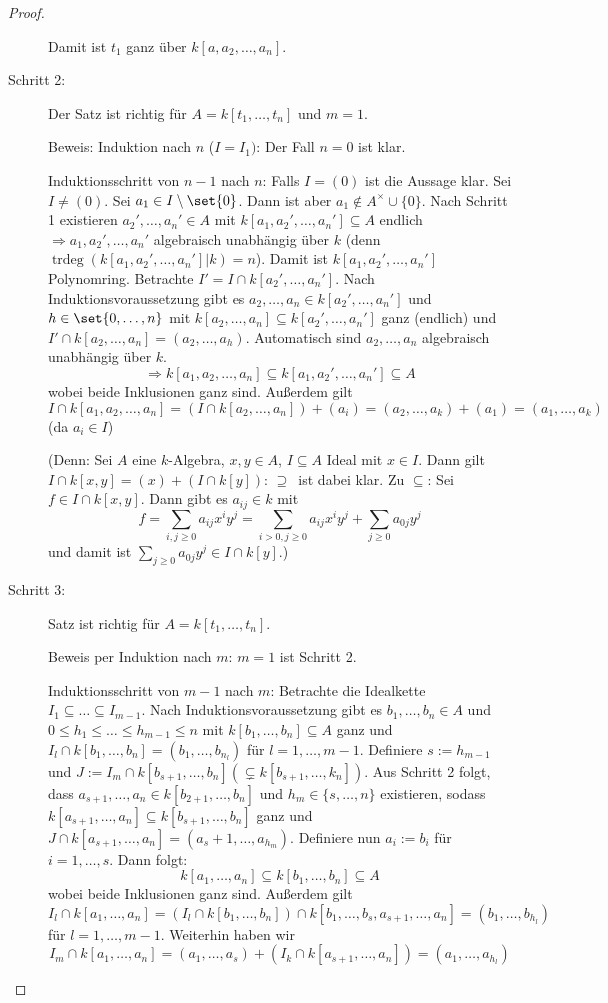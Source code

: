 \documentclass[12pt,a4paper]{scrartcl}
\theoremstyle{cplain}
\theoremstyle{cdef}
\begin{document}
\begin{proof}
\begin{description}
		Damit ist $t_1$ ganz über $k[a, a_2,\dots, a_n]$.
		\item[Schritt 2:] Der Satz ist richtig für $A = k[t_1,\dots, t_n]$ und $m = 1$.
		
		Beweis: Induktion nach $n$ ($I = I_1)$: Der Fall $n = 0$ ist klar.
		
		Induktionsschritt von $n-1$ nach $n$: Falls $I = (0)$ ist die Aussage klar. Sei $I \neq (0)$. Sei $a_1\in I\setminus\set{0}$. Dann ist aber $a_1\notin A^{\times}\cup\{0\}$. Nach Schritt 1 existieren $a_2', \dots, a_n'\in A$ mit $k[a_1, a_2',\dots, a_n']\subseteq A$ endlich $\Rightarrow a_1, a_2',\dots, a_n'$ algebraisch unabhängig über $k$ (denn $\operatorname{trdeg}(k[a_1,a_2',\dots, a_n']|k) = n$). Damit ist $k[a_1, a_2',\dots, a_n']$ Polynomring. Betrachte $I' = I\cap k[a_2',\dots, a_n']$. Nach Induktionsvoraussetzung gibt es $a_2,\dots, a_n\in k[a_2',\dots, a_n']$ und $h \in \set{0,\dots, n}$ mit $k[a_2,\dots, a_n]\subseteq k[a_2',\dots, a_n']$ ganz (endlich) und $I'\cap k[a_2,\dots, a_n] = (a_2,\dots, a_h)$.
		Automatisch sind $a_2,\dots, a_n$ algebraisch unabhängig über $k$.
		$$\Rightarrow k[a_1,a_2,\dots, a_n]\subseteq k[a_1,a_2',\dots, a_n']\subseteq A$$
		wobei beide Inklusionen ganz sind. Außerdem gilt
		$$I\cap k[a_1,a_2,\dots, a_n] = (I\cap k[a_2,\dots, a_n]) + (a_i) = (a_2, \dots, a_k) + (a_1) = (a_1,\dots, a_k)$$
		(da $a_i\in I$)
		
		(Denn: Sei $A$ eine $k$-Algebra, $x,y\in A$, $I\subseteq A$ Ideal mit $x\in I$. Dann gilt $I\cap k[x,y] = (x) + (I\cap k[y])$: \glqq$\supseteq$\grqq\ ist dabei klar. Zu \glqq$\subseteq$\grqq: Sei $f\in I\cap k[x,y]$. Dann gibt es $a_{ij}\in k$ mit
		$$f = \sum_{i,j\ge 0}a_{ij}x^iy^j = \sum_{i>0, j\ge0}a_{ij}x^{i}y^j + \sum_{j\ge 0} a_{0j}y^j$$
		und damit ist $\sum_{j\ge 0}a_{0j}y^j\in I\cap k[y]$.)
		
		\item[Schritt 3:] Satz ist richtig für $ A = k[t_1,\dots, t_n]$.
		
		Beweis per Induktion nach $m$: $m = 1$ ist Schritt 2.
		
		Induktionsschritt von $m-1$ nach $m$: Betrachte die Idealkette $I_1\subseteq\dots\subseteq I_{m-1}$. Nach Induktionsvoraussetzung gibt es $b_1,\dots, b_n\in A$ und $0\le h_1\le\dots\le h_{m-1}\le n$ mit $k[b_1,\dots, b_n]\subseteq A$ ganz und $I_l\cap k[b_1,\dots, b_n] = (b_1,\dots, b_{n_l})$ für $l = 1,\dots, m-1$. Definiere $s := h_{m-1}$ und $J := I_m\cap k[b_{s+1},\dots, b_n] (\subsetneq k[b_{s+1},\dots, k_n])$. Aus Schritt 2 folgt, dass $a_{s+1}, \dots, a_n\in k[b_{2+1},\dots, b_n]$ und $h_m\in \{s,\dots, n\}$ existieren, sodass $k[a_{s+1},\dots, a_n]\subseteq k[b_{s+1},\dots, b_n]$ ganz und $J\cap k[a_{s+1},\dots, a_n] = (a_s+1,\dots, a_{h_m})$. Definiere nun $a_i := b_i$ für $i = 1,\dots, s$. Dann folgt:
		$$k[a_1,\dots, a_n] \subseteq k[b_1,\dots, b_n]\subseteq A$$
		wobei beide Inklusionen ganz sind. Außerdem gilt
		$$I_l\cap k[a_1,\dots, a_n] = (I_l\cap k[b_1,\dots, b_n])\cap k[b_1,\dots, b_s, a_{s+1},\dots, a_n] = (b_1,\dots, b_{h_l})$$
		für $l = 1,\dots, m-1$. Weiterhin haben wir 
		$$I_m\cap k[a_1,\dots, a_n] = (a_1,\dots, a_s)+(I_k\cap k[a_{s+1},\dots, a_n]) = (a_1,\dots, a_{h_l})$$
		

\end{description}
\end{proof}
\end{document}
